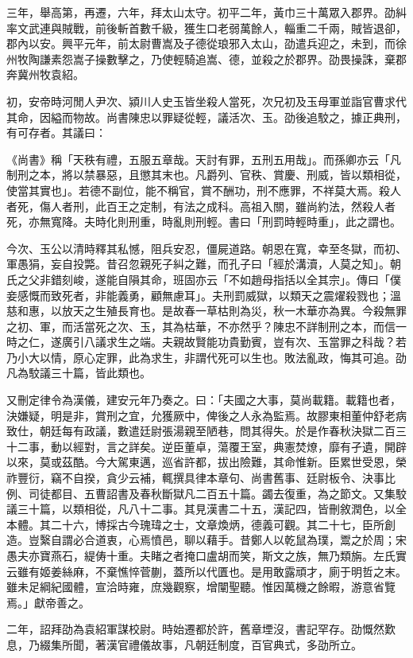 \begin{pinyinscope}
三年，舉高第，再遷，六年，拜太山太守。初平二年，黃巾三十萬眾入郡界。劭糾率文武連與賊戰，前後斬首數千級，獲生口老弱萬餘人，輜重二千兩，賊皆退卻，郡內以安。興平元年，前太尉曹嵩及子德從琅邪入太山，劭遣兵迎之，未到，而徐州牧陶謙素怨嵩子操數擊之，乃使輕騎追嵩、德，並殺之於郡界。劭畏操誅，棄郡奔冀州牧袁紹。

初，安帝時河閒人尹次、潁川人史玉皆坐殺人當死，次兄初及玉母軍並詣官曹求代其命，因縊而物故。尚書陳忠以罪疑從輕，議活次、玉。劭後追駮之，據正典刑，有可存者。其議曰：

《尚書》稱「天秩有禮，五服五章哉。天討有罪，五刑五用哉」。而孫卿亦云「凡制刑之本，將以禁暴惡，且懲其末也。凡爵列、官秩、賞慶、刑威，皆以類相從，使當其實也」。若德不副位，能不稱官，賞不酬功，刑不應罪，不祥莫大焉。殺人者死，傷人者刑，此百王之定制，有法之成科。高祖入關，雖尚約法，然殺人者死，亦無寬降。夫時化則刑重，時亂則刑輕。書曰「刑罰時輕時重」，此之謂也。

今次、玉公以清時釋其私憾，阻兵安忍，僵屍道路。朝恩在寬，幸至冬獄，而初、軍愚狷，妄自投斃。昔召忽親死子糾之難，而孔子曰「經於溝瀆，人莫之知」。朝氏之父非錯刻峻，遂能自隕其命，班固亦云「不如趙母指括以全其宗」。傳曰「僕妾感慨而致死者，非能義勇，顧無慮耳」。夫刑罰威獄，以類天之震燿殺戮也；溫慈和惠，以放天之生殖長育也。是故春一草枯則為災，秋一木華亦為異。今殺無罪之初、軍，而活當死之次、玉，其為枯華，不亦然乎？陳忠不詳制刑之本，而信一時之仁，遂廣引八議求生之端。夫親故賢能功貴勤賓，豈有次、玉當罪之科哉？若乃小大以情，原心定罪，此為求生，非謂代死可以生也。敗法亂政，悔其可追。劭凡為駮議三十篇，皆此類也。

又刪定律令為漢儀，建安元年乃奏之。曰：「夫國之大事，莫尚載籍。載籍也者，決嫌疑，明是非，賞刑之宜，允獲厥中，俾後之人永為監焉。故膠東相董仲舒老病致仕，朝廷每有政議，數遣廷尉張湯親至陋巷，問其得失。於是作春秋決獄二百三十二事，動以經對，言之詳矣。逆臣董卓，蕩覆王室，典憲焚燎，靡有孑遺，開辟以來，莫或茲酷。今大駕東邁，巡省許都，拔出險難，其命惟新。臣累世受恩，榮祚豐衍，竊不自揆，貪少云補，輒撰具律本章句、尚書舊事、廷尉板令、決事比例、司徒都目、五曹詔書及春秋斷獄凡二百五十篇。蠲去復重，為之節文。又集駮議三十篇，以類相從，凡八十二事。其見漢書二十五，漢記四，皆刪敘潤色，以全本體。其二十六，博採古今瑰瑋之士，文章煥炳，德義可觀。其二十七，臣所創造。豈繄自謂必合道衷，心焉憤邑，聊以藉手。昔鄭人以乾鼠為璞，鬻之於周；宋愚夫亦寶燕石，緹俦十重。夫睹之者掩口盧胡而笑，斯文之族，無乃類旃。左氏實云雖有姬姜絲麻，不棄憔悴菅蒯，蓋所以代匱也。是用敢露頑才，廁于明哲之末。雖未足綱紀國體，宣洽時雍，庶幾觀察，增闡聖聽。惟因萬機之餘暇，游意省覽焉。」獻帝善之。

二年，詔拜劭為袁紹軍謀校尉。時始遷都於許，舊章堙沒，書記罕存。劭慨然歎息，乃綴集所聞，著漢官禮儀故事，凡朝廷制度，百官典式，多劭所立。


\end{pinyinscope}
